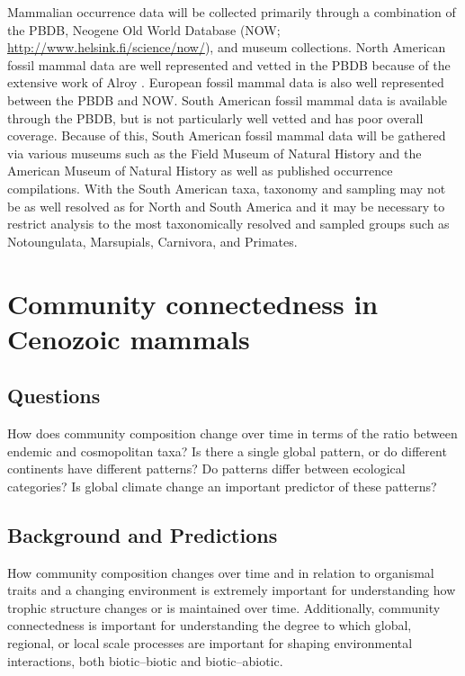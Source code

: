 \documentclass[12pt,letterpaper]{article}
\begin{document}
Mammalian occurrence data will be collected primarily through a combination of the PBDB, Neogene Old World Database (NOW; \url{http://www.helsink.fi/science/now/}), and museum collections. North American fossil mammal data are well represented and vetted in the PBDB because of the extensive work of Alroy \citep{Alroy1996a,Alroy1998,Alroy2000g}. European fossil mammal data is also well represented between the PBDB and NOW. South American fossil mammal data is available through the PBDB, but is not particularly well vetted and has poor overall coverage. Because of this, South American fossil mammal data will be gathered via various museums such as the Field Museum of Natural History and the American Museum of Natural History as well as published occurrence compilations. With the South American taxa, taxonomy and sampling may not be as well resolved as for North and South America and it may be necessary to restrict analysis to the most taxonomically resolved and sampled groups such as Notoungulata, Marsupials, Carnivora, and Primates.


\section{Community connectedness in Cenozoic mammals} \label{sec:mamcom}

\subsection{Questions} \label{sec:mamcomques}
How does community composition change over time in terms of the ratio between endemic and cosmopolitan taxa? Is there a single global pattern, or do different continents have different patterns? Do patterns differ between ecological categories? Is global climate change an important predictor of these patterns?

\subsection{Background and Predictions} \label{sec:mamcomback}
How community composition changes over time and in relation to organismal traits and a changing environment is extremely important for understanding how trophic structure changes or is maintained over time. Additionally, community connectedness is important for understanding the degree to which global, regional, or local scale processes are important for shaping environmental interactions, both biotic--biotic and biotic--abiotic.
\end{document}
